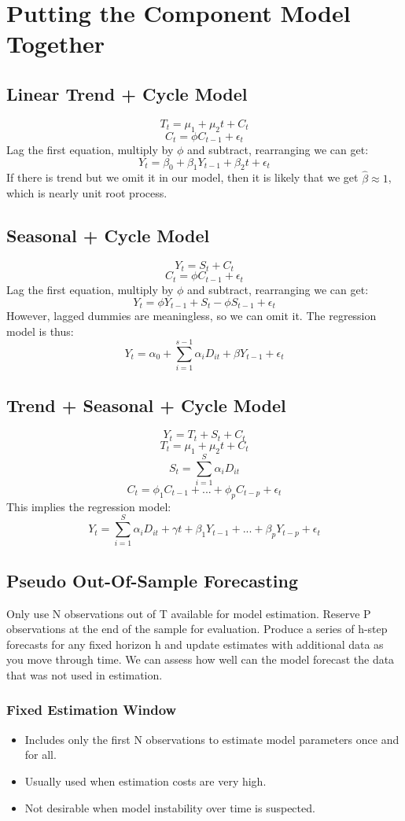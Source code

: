\documentclass{article}
\begin{document}
\section{Putting the Component Model Together}
\subsection{Linear Trend + Cycle Model}
$$T_t = \mu_1 + \mu_2 t + C_t$$
$$C_t = \phi C_{t-1} + \epsilon_t$$
Lag the first equation, multiply by $\phi$ and subtract, rearranging we can get:
$$Y_t = \beta_0 + \beta_1 Y_{t-1} + \beta_2 t + \epsilon_t$$
If there is trend but we omit it in our model, then it is likely that we get $\hat{\beta}\approx 1$, which is nearly unit root process.

\subsection{Seasonal + Cycle Model}
$$Y_t = S_t + C_t$$
$$C_t = \phi C_{t-1} + \epsilon_t$$
Lag the first equation, multiply by $\phi$ and subtract, rearranging we can get:
$$Y_t = \phi Y_{t-1} + S_t - \phi S_{t-1} + \epsilon_t$$
However, lagged dummies are meaningless, so we can omit it. The regression model is thus:
$$Y_t = \alpha_0 + \sum_{i=1}^{s-1}\alpha_i D_{it} + \beta Y_{t-1} + \epsilon_t$$

\subsection{Trend + Seasonal + Cycle Model}
$$Y_t = T_t + S_t + C_t$$
$$T_t = \mu_1 + \mu_2 t + C_t$$
$$S_t = \sum_{i=1}^S \alpha_i D_{it}$$
$$C_t = \phi_1 C_{t-1} + ... + \phi_p C_{t-p} + \epsilon_t$$
This implies the regression model:
$$Y_t = \sum_{i=1}^S \alpha_i D_{it} + \gamma t + \beta_1 Y_{t-1} + ... + \beta_p Y_{t-p} + \epsilon_t$$

\subsection{Pseudo Out-Of-Sample Forecasting}
Only use N observations out of T available for model estimation. Reserve P observations at the end of the sample for evaluation. Produce a series of h-step forecasts for any fixed horizon h and update estimates with additional data as you move through time. We can assess how well can the model forecast the data that was not used in estimation.

\subsubsection{Fixed Estimation Window}
\begin{itemize}
    \item Includes only the first N observations to estimate model parameters once and for all.
    \item Usually used when estimation costs are very high.
    \item Not desirable when model instability over time is suspected.
\end{itemize}
\end{document}
